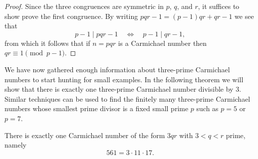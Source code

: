 \begin{proof}
  Since the three congruences are symmetric in $p$, $q$, and $r$, it suffices to show prove the first congruence. By writing $pqr-1=(p-1)qr+qr-1$ we see that
  \begin{equation*}
    p-1\mid pqr-1\quad\Leftrightarrow\quad p-1\mid qr-1,
  \end{equation*}
  from which it follows that if $n=pqr$ is a Carmichael number then $qr\equiv 1\pmod{p-1}$.
\end{proof}

We have now gathered enough information about three-prime Carmichael numbers to start hunting for small examples. In the following theorem we will show that there is exactly one three-prime Carmichael number divisible by $3$. Similar techniques can be used to find the finitely many three-prime Carmichael numbers whose smallest prime divisor is a fixed small prime $p$ such as $p=5$ or $p=7$.

\begin{theorem}
  There is exactly one Carmichael number of the form $3qr$ with $3<q<r$ prime, namely
  \begin{equation*}
    561=3\cdot 11\cdot 17.
  \end{equation*}
\end{theorem}

